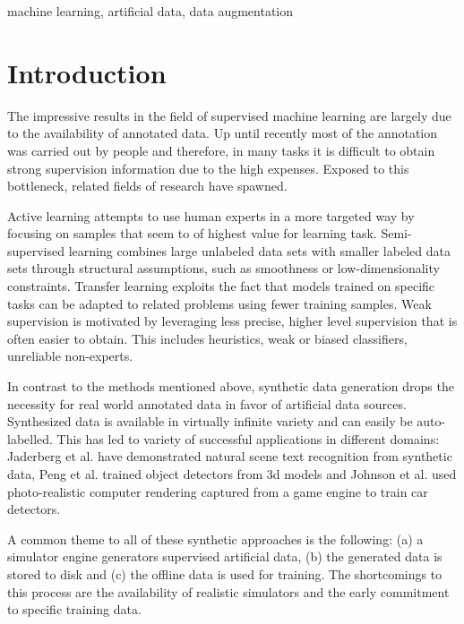 \documentclass[conference]{IEEEtran}
\begin{document}
\begin{IEEEkeywords}
machine learning, artificial data, data augmentation
\end{IEEEkeywords}

\section{Introduction}
The impressive results in the field of supervised machine learning are largely due to the availability of annotated data. Up until recently most of the annotation was carried out by people and therefore, in many tasks it is difficult to obtain strong supervision information due to the high expenses. Exposed to this bottleneck, related fields of research have spawned. 

Active learning \cite{druck2009active, settles2012active, cakmak2012designing} attempts to use human experts in a more targeted way by focusing on samples that seem to of highest value for learning task. Semi-supervised learning \cite{chapelle2009semi, salimans2016improved, zhu2006semi} combines large unlabeled data sets with smaller labeled data sets through structural assumptions, such as smoothness or low-dimensionality constraints. Transfer learning \cite{pratt1993discriminability, ventura2007theoretical, pan2010survey} exploits the fact that models trained on specific tasks can be adapted to related problems using fewer training samples. Weak supervision \cite{ratner2016data, zhou2017brief} is motivated by leveraging less precise, higher level supervision that is often easier to obtain. This includes heuristics, weak or biased classifiers, unreliable non-experts. 


In contrast to the methods mentioned above, synthetic data generation drops the necessity for real world annotated data in favor of artificial data sources. Synthesized data is available in virtually infinite variety and can easily be auto-labelled. This has led to variety of successful applications in different domains: Jaderberg et al. \cite{jaderberg2014synthetic} have demonstrated natural scene text recognition from synthetic data, Peng et al. \cite{peng2015learning} trained object detectors from 3d models and Johnson et al. \cite{2017_Johnson_DrivingInTheMatrix} used photo-realistic computer rendering captured from a game engine to train car detectors. 

A common theme to all of these synthetic approaches is the following: (a) a simulator engine generators supervised artificial data, (b) the generated data is stored to disk and (c) the offline data is used for training. The shortcomings to this process are the availability of realistic simulators and the early commitment to specific training data. 
\end{document}
